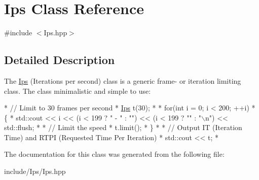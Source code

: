 \hypertarget{class_ips}{\section{Ips Class Reference}
\label{class_ips}
}


{\ttfamily \#include $<$Ips.\-hpp$>$}



\subsection{Detailed Description}
The \hyperlink{class_ips}{Ips} (Iterations per second) class is a generic frame-\/ or iteration limiting class. The class minimalistic and simple to use\-:


\begin{DoxyCode}
*  \textcolor{comment}{// Limit to 30 frames per second}
*  \hyperlink{class_ips}{Ips} t(30);
* 
*  \textcolor{keywordflow}{for}(\textcolor{keywordtype}{int} i = 0; i < 200; ++i)
*  \{
*      std::cout << i << (i < 199 ? \textcolor{stringliteral}{" - "} : \textcolor{stringliteral}{""}) << (i < 199 ? \textcolor{stringliteral}{""} : \textcolor{stringliteral}{"\(\backslash\)n"}) << std::flush;
* 
*      \textcolor{comment}{// Limit the speed}
*      t.limit();
*  \}
* 
*  \textcolor{comment}{// Output IT (Iteration Time) and RTPI (Requested Time Per Iteration)}
*  std::cout << t;
*  
\end{DoxyCode}
 

The documentation for this class was generated from the following file\-:\begin{DoxyCompactItemize}
\item 
include/\-Ips/Ips.\-hpp\end{DoxyCompactItemize}
